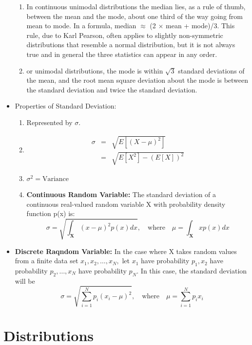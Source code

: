 \documentclass[a4paper,oneside]{book}
\begin{document}
\begin{itemize}
\begin{enumerate}
\item In continuous unimodal distributions the median lies, as a rule of thumb, between the mean and the mode, about one third of the way going from mean to mode. In a formula, median $\approx$ (2 $\times$ mean + mode)/3. This rule, due to Karl Pearson, often applies to slightly non-symmetric distributions that resemble a normal distribution, but it is not always true and in general the three statistics can appear in any order.
\item or unimodal distributions, the mode is within  $\sqrt{3} $ standard deviations of the mean, and the root mean square deviation about the mode is between the standard deviation and twice the standard deviation.
\end{enumerate}
\item Properties of Standard Deviation:
\begin{enumerate}
\item Represented by $\sigma$.
\item  \begin{eqnarray}
\sigma & = & \sqrt{E\left[(X - \mu)^{2}\right]}\\
& = & \sqrt{E\left[X^{2}\right] - (E\left[X\right])^{2}}
\end{eqnarray}
\item $\sigma^{2} = \text{Variance}$
\item \textbf{Continuous Random Variable: }The standard deviation of a continuous real-valued random variable X with probability density function p(x) is:
$$ \sigma = \sqrt{\int_{\mathbf{X}}(x - \mu)^{2}p(x)dx}, \hspace{1em} \text{where} \hspace{1em} \mu = \int_{\mathbf{X}}  xp(x) dx$$
\end{enumerate}
\item \textbf{Discrete Raqndom Variable: }In the case where X takes random values from a finite data set $x_1, x_2, \ldots , x_N,$ let $x_1$ have probability $p_1, x_2$ have probability $p_2, \ldots, x_N$ have probability $p_N$. In this case, the standard deviation will be
$$ \sigma = \sqrt{\sum_{i = 1}^{N}p_i(x_i - \mu)^{2}} , \hspace{1em} \text{where} \hspace{1em} \mu = \sum_{i = 1}^{N}p_ix_i$$
\end{itemize}
\section{Distributions}
\end{document}
